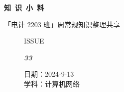 \documentclass[UTF8]{ctexart}
\newcommand\Black[1]{\textcolor[gray]{0.3}{#1}}
\newcommand\Brown[1]{\textcolor[HTML]{998A4E}{#1}}
\newcommand\IssueNumber{33}
\newcommand\Date{2024-9-13}
\newcommand\Subject{计算机网络}
\begin{document}
\BgThispage
\begin{center}
\phantom{...}

{\Large\textcolor{brown!40!white}{}}

\vspace{-2em}

{\Huge\bfseries\TitleFont \Black{知\ 识\ 小\ 料}}


\vspace{-0.1cm}
{\footnotesize \Brown{「电计 2203 班」周常规知识整理共享}}
\end{center}

\vspace{-0.5cm}


\begin{figure}[H]
\hspace{1cm}
\begin{minipage}[t]{0.3\textwidth}
\centering
    \Brown{\Genshin ISSUE}

    \vspace{-0.6cm}
    \Huge \Issue\slshape\bfseries\Black{\IssueNumber}
\end{minipage}
\hfill
\begin{minipage}[t]{0.35\textwidth}
\centering
    \Brown{日期：\Date} \\
\vspace{-0.1cm}
    \Brown{学科：\Subject} \\
\end{minipage}
\hspace{0.8cm}
\end{figure}
\end{document}
